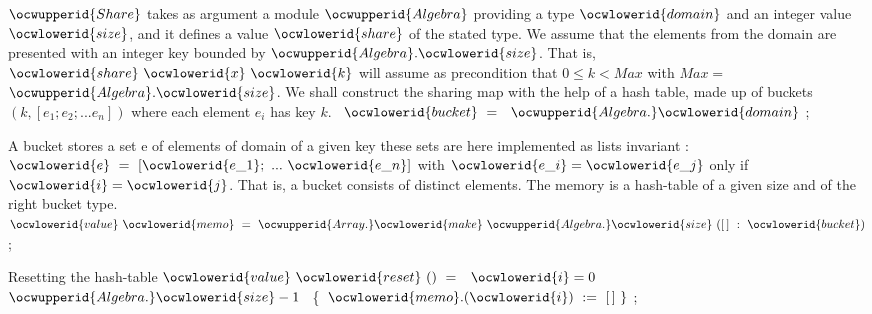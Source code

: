 \documentclass[12pt]{article}
\begin{document}
\ocwendcode{}\ocwindent{0.00em}
\ocwbegindcode{}$\ocwupperid{Share}$\ocwenddcode{} takes as argument a module \ocwbegindcode{}$\ocwupperid{Algebra}$\ocwenddcode{} providing
a type \ocwbegindcode{}$\ocwlowerid{domain}$\ocwenddcode{} and an integer value \ocwbegindcode{}$\ocwlowerid{size}$\ocwenddcode{}, and it defines a
value \ocwbegindcode{}$\ocwlowerid{share}$\ocwenddcode{} of the stated type. 
We assume that the elements from the domain are presented with an
integer key bounded by \ocwbegindcode{}$\ocwupperid{Algebra}.\ocwlowerid{size}$\ocwenddcode{}. 
That is, \ocwbegindcode{}$\ocwlowerid{share}~\ocwlowerid{x}~\ocwlowerid{k}$\ocwenddcode{} will assume as precondition that
$0\leq k<Max$ with $Max=$\ocwbegindcode{}$\ocwupperid{Algebra}.\ocwlowerid{size}$\ocwenddcode{}. 
\ocweol
\ocwindent{0.00em}
We shall construct the sharing map with the help of a hash table, 
made up of buckets $(k,[e_1; e_2; ... e_n])$ where each element $e_i$
has key $k$. 
\ocweol
\label{../ML/share.ml:1496}%
\medskip
\ocwbegincode{}\ocwindent{0.00em}
~$\ocwlowerid{bucket}~=~$~$\ocwupperid{Algebra.}\ocwlowerid{domain}$\ocweol
\ocwindent{0.00em}
;\medskip

\ocwendcode{}\ocwindent{0.00em}
A bucket stores a set e of elements of domain of a given key
   these sets are here implemented as lists 
   invariant : \ocwbegindcode{}$\ocwlowerid{e}~=~[\ocwlowerid{e\_1};~...~\ocwlowerid{e\_n}]$\ocwenddcode{} with \ocwbegindcode{}$\ocwlowerid{e\_i}=\ocwlowerid{e\_j}$\ocwenddcode{} only if \ocwbegindcode{}$\ocwlowerid{i}=\ocwlowerid{j}$\ocwenddcode{}. 
   That is, a bucket consists of distinct elements. 
\ocweol
\ocwindent{0.00em}
The memory is a hash-table of a given size and of the right bucket type. 
\ocweol
\label{../ML/share.ml:1844}%
\medskip
\ocwbegincode{}\ocwindent{0.00em}
$\ocwlowerid{value}~\ocwlowerid{memo}~=~\ocwupperid{Array.}\ocwlowerid{make}~\ocwupperid{Algebra.}\ocwlowerid{size}~([\,]~:~\ocwlowerid{bucket})$\ocweol
\ocwindent{0.00em}
;\medskip

\ocwendcode{}\ocwindent{0.00em}
Resetting the hash-table 
\ocweol
\label{../ML/share.ml:1929}%
\medskip
\ocwbegincode{}\ocwindent{0.00em}
$\ocwlowerid{value}~\ocwlowerid{reset}~()~=~$~$\ocwlowerid{i}=0~$~$\ocwupperid{Algebra.}\ocwlowerid{size}-1~$~\{~$\ocwlowerid{memo}.(\ocwlowerid{i})~:=~[\,]~\}$\ocweol
\ocwindent{0.00em}
;\medskip
\end{document}
